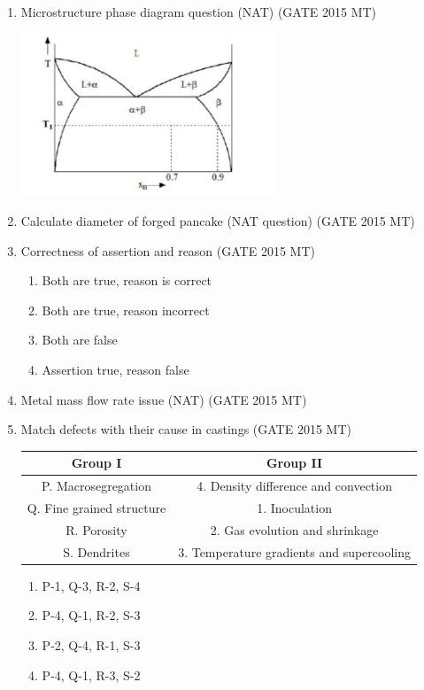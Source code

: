 \documentclass[12pt]{article}
\begin{document}
\begin{enumerate}
\item Microstructure phase diagram question (NAT) (GATE 2015 MT)
\begin{center}
  \includegraphics[width=0.6\textwidth]{images/q54i.jpg}
\end{center}

\item Calculate diameter of forged pancake (NAT question) (GATE 2015 MT)

\item Correctness of assertion and reason (GATE 2015 MT)
\begin{enumerate}[label=(\alph*)]
  \item Both are true, reason is correct
  \item Both are true, reason incorrect
  \item Both are false
  \item Assertion true, reason false
\end{enumerate}


\item Metal mass flow rate issue (NAT) (GATE 2015 MT)

\item Match defects with their cause in castings (GATE 2015 MT)
\begin{table}[h]
\centering
\begin{tabular}{|c|c|}
\hline
Group I & Group II \\
\hline
P. Macrosegregation & 4. Density difference and convection \\
Q. Fine grained structure & 1. Inoculation \\
R. Porosity & 2. Gas evolution and shrinkage \\
S. Dendrites & 3. Temperature gradients and supercooling \\
\hline
\end{tabular}
\end{table}
\begin{enumerate}[label=(\alph*)]
  \item P-1, Q-3, R-2, S-4
  \item P-4, Q-1, R-2, S-3
  \item P-2, Q-4, R-1, S-3
  \item P-4, Q-1, R-3, S-2
\end{enumerate}


\end{enumerate}
\end{document}
